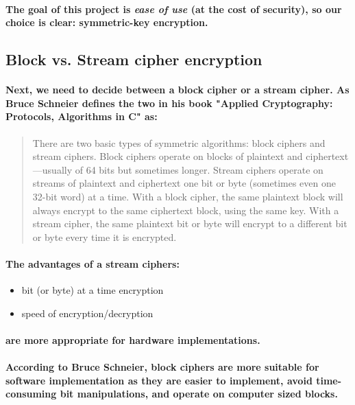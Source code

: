 \paragraph{The goal of this project is \emph{ease of use} (at the cost of security), so our choice is clear: symmetric-key encryption.}

\subsection{Block vs. Stream cipher encryption}
\paragraph{Next, we need to decide between a block cipher or a stream cipher. As Bruce Schneier defines the two in his book "Applied Cryptography: Protocols, Algorithms in C" as:}

\begin{quote}
There are two basic types of symmetric algorithms: block ciphers and stream ciphers. Block ciphers
operate on blocks of plaintext and ciphertext—usually of 64 bits but sometimes longer. Stream
ciphers operate on streams of plaintext and ciphertext one bit or byte (sometimes even one 32-bit
word) at a time. With a block cipher, the same plaintext block will always encrypt to the same
ciphertext block, using the same key. With a stream cipher, the same plaintext bit or byte will
encrypt to a different bit or byte every time it is encrypted.\cite[p. 12]{Schneier}
\end{quote}
\paragraph{The advantages of a stream ciphers:}

\begin{itemize}
\item bit (or byte) at a time encryption
\item speed of encryption/decryption
\end{itemize}

\paragraph{are more appropriate for hardware implementations.}

\paragraph{According to Bruce Schneier, block ciphers are more suitable for software implementation as they are easier to implement, avoid time-consuming bit manipulations, and operate on computer sized blocks.}\cite[p. 172]{Schneier}

